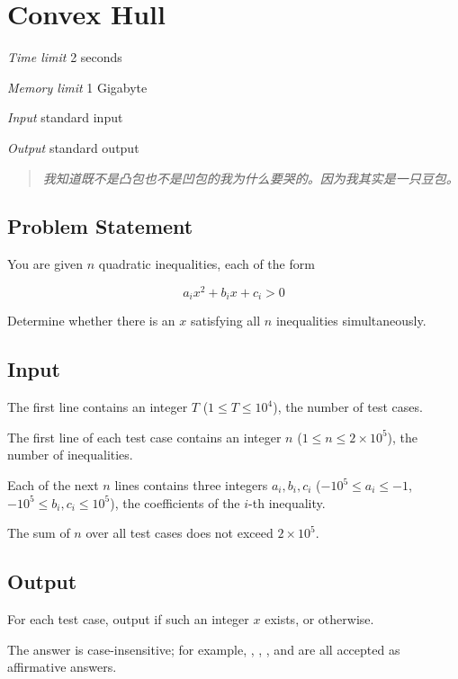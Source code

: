 \section[F. Convex Hull]{ Convex Hull}

\textit{Time limit}   2 seconds

\textit{Memory limit} 1 Gigabyte

\textit{Input} \qquad standard input

\textit{Output} \qquad standard output


\begin{quote}
	\textit{我知道既不是凸包也不是凹包的我为什么要哭的。因为我其实是一只豆包。}
\end{quote}

\subsection{Problem Statement}

You are given $n$ quadratic inequalities, each of the form

$$
a_i x^2 + b_i x + c_i  >  0
$$

Determine whether there is an  $x$ satisfying all $n$ inequalities simultaneously.

\subsection{Input}

The first line contains an integer $T$ ($1 \le T \le 10^4$), the number of test cases.

The first line of each test case contains an integer $n$ ($1 \le n \le 2 \times 10^5$), the number of inequalities.

Each of the next $n$ lines contains three integers $a_i,b_i,c_i$ ($-10^5 \le a_i \le -1$, $-10^5 \le b_i,c_i \le 10^5$), the coefficients of the $i$-th inequality.

The sum of $n$ over all test cases does not exceed $2 \times 10^5$.

\subsection{Output}

For each test case, output  if such an integer $x$ exists, or  otherwise.

The answer is case-insensitive; for example, , , , and  are all accepted as affirmative answers.

